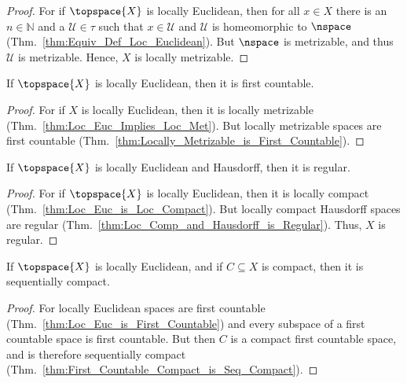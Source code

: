         \begin{proof}
            For if $\topspace{X}$ is locally Euclidean, then for all $x\in{X}$
            there is an $n\in\mathbb{N}$ and a $\mathcal{U}\in\tau$ such that
            $x\in\mathcal{U}$ and $\mathcal{U}$ is homeomorphic to
            $\nspace$ (Thm.~\ref{thm:Equiv_Def_Loc_Euclidean}). But
            $\nspace$ is metrizable, and thus $\mathcal{U}$ is metrizable.
            Hence, $X$ is locally metrizable.
        \end{proof}
        \begin{theorem}
            \label{thm:Loc_Euc_is_First_Countable}%
            If $\topspace{X}$ is locally Euclidean, then it is first
            countable.
        \end{theorem}
        \begin{proof}
            For if $X$ is locally Euclidean, then it is locally metrizable
            (Thm.~\ref{thm:Loc_Euc_Implies_Loc_Met}). But locally
            metrizable spaces are first countable
            (Thm.~\ref{thm:Locally_Metrizable_is_First_Countable}).
        \end{proof}
        \begin{theorem}
            \label{thm:Loc_Euc_Haus_is_Regular}%
            If $\topspace{X}$ is locally Euclidean and Hausdorff, then it is
            regular.
        \end{theorem}
        \begin{proof}
            For if $\topspace{X}$ is locally Euclidean, then it is locally
            compact (Thm.~\ref{thm:Loc_Euc_is_Loc_Compact}). But locally
            compact Hausdorff spaces are regular
            (Thm.~\ref{thm:Loc_Comp_and_Hausdorff_is_Regular}). Thus,
            $X$ is regular.
        \end{proof}
        \begin{theorem}
            \label{thm:Comp_Sub_of_Loc_Euc_is_Seq_Comp}%
            If $\topspace{X}$ is locally Euclidean, and if $C\subseteq{X}$
            is compact, then it is sequentially compact.
        \end{theorem}
        \begin{proof}
            For locally Euclidean spaces are first countable
            (Thm.~\ref{thm:Loc_Euc_is_First_Countable}) and every subspace
            of a first countable space is first countable. But then $C$ is
            a compact first countable space, and is therefore sequentially
            compact (Thm.~\ref{thm:First_Countable_Compact_is_Seq_Compact}).
        \end{proof}
